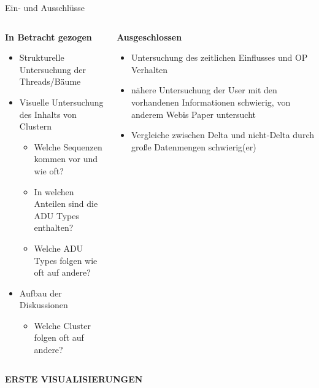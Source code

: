 \documentclass[compress,12pt]{beamer}
\begin{document}
    \begin{frame}{Ein- und Ausschlüsse}
        \begin{columns}
            \begin{column}{0.5\textwidth}
                \textbf{In Betracht gezogen}
                \begin{itemize}
                    \item Strukturelle Untersuchung der Threads/Bäume
                    \item Visuelle Untersuchung des Inhalts von Clustern
                    \begin{itemize}
                        \item Welche Sequenzen kommen vor und wie oft?
                        \item In welchen Anteilen sind die ADU Types enthalten?
                        \item Welche ADU Types folgen wie oft auf andere?
                    \end{itemize}
                    \item Aufbau der Diskussionen
                    \begin{itemize}
                        \item Welche Cluster folgen oft auf andere?
                    \end{itemize}
                \end{itemize}
            \end{column}
            \begin{column}{0.5\textwidth}
                \textbf{Ausgeschlossen}
                \begin{itemize}
                    \item Untersuchung des zeitlichen Einflusses und OP Verhalten
                    \item nähere Untersuchung der User \textrightarrow{} mit den vorhandenen Informationen schwierig, von anderem Webis Paper untersucht
                    \item Vergleiche zwischen Delta und nicht-Delta durch große Datenmengen schwierig(er)
                \end{itemize}
            \end{column}
        \end{columns}
    \end{frame}

    \End

    \begin{frame}
        \centering
        \textbf{ERSTE VISUALISIERUNGEN}
    \end{frame}
\end{document}
